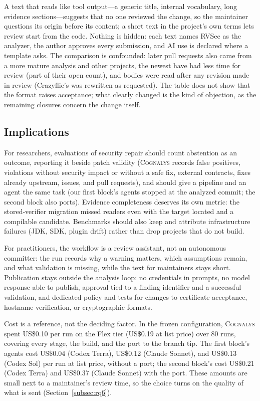 \documentclass[conference]{IEEEtran}
\newcommand{\system}{\textsc{Cognalys}}
\begin{document}
A text that reads like tool output---a generic title, internal vocabulary,
long evidence sections---suggests that no one reviewed the change, so the
maintainer questions its origin before its content; a short text in the
project's own terms lets review start from the code. Nothing is hidden: each
text names RVSec as the analyzer, the author approves every submission, and AI
use is declared where a template asks. The comparison is confounded: later
pull requests also came from a more mature analysis and other projects, the
newest have had less time for review (part of their open count), and bodies
were read after any revision made in review (Crazyflie's was rewritten as
requested). The table does not show that the format raises acceptance; what
clearly changed is the kind of objection, as the remaining closures concern
the change itself.

\subsection{Implications}

For researchers, evaluations of security repair should count abstention as an
outcome, reporting it beside patch validity (\system{} records false
positives, violations without security impact or without a safe fix, external
contracts, fixes already upstream, issues, and pull requests), and should give
a pipeline and an agent the same task (our first block's agents stopped at the
analyzed commit; the second block also ports). Evidence completeness
deserves its own metric: the stored-verifier migration missed readers even
with the target located and a compilable candidate. Benchmarks should also
keep and attribute infrastructure failures (JDK, SDK, plugin drift) rather
than drop projects that do not build.

For practitioners, the workflow is a review assistant, not an autonomous
committer: the run records why a warning matters, which assumptions remain,
and what validation is missing, while the text for maintainers stays short.
Publication stays outside the analysis loop: no credentials in prompts, no
model response able to publish, approval tied to a finding identifier and a
successful validation, and dedicated policy and tests for changes to certificate
acceptance, hostname verification, or cryptographic formats.

Cost is a reference, not the deciding factor. In the frozen configuration,
\system{} spent US\$0.10 per run on the Flex tier (US\$0.19 at list price) over
80 runs, covering every stage, the build, and the port to the branch tip. The
first block's agents cost US\$0.04 (Codex Terra), US\$0.12 (Claude Sonnet),
and US\$0.13 (Codex Sol) per run at list price, without a port; the second block's cost US\$0.21
(Codex Terra) and US\$0.37 (Claude Sonnet) with the port. These
amounts are small next to a maintainer's review time, so the choice turns on
the quality of what is sent (Section~\ref{subsec:rq6}).
\end{document}
